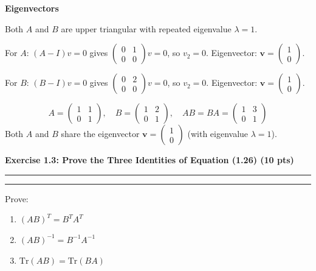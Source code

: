 \documentclass[12pt]{article}
\newcommand{\question}[1]{%
  \clearpage
  \vspace{0.5cm}
  {\noindent\normalsize \textbf{#1}}
  \vspace{0.2cm}
  \hrule
  \vspace{0.1cm}
  \hrule
  \vspace{0.3cm}
}
\begin{document}
\begin{stepbox}
\textbf{Eigenvectors}

Both $A$ and $B$ are upper triangular with repeated eigenvalue $\lambda = 1$.

For $A$: $(A - I)v = 0$ gives $\begin{pmatrix} 0 & 1 \\ 0 & 0 \end{pmatrix}v = 0$, so $v_2 = 0$. Eigenvector: $\mathbf{v} = \begin{pmatrix} 1 \\ 0 \end{pmatrix}$.

For $B$: $(B - I)v = 0$ gives $\begin{pmatrix} 0 & 2 \\ 0 & 0 \end{pmatrix}v = 0$, so $v_2 = 0$. Eigenvector: $\mathbf{v} = \begin{pmatrix} 1 \\ 0 \end{pmatrix}$.
\end{stepbox}

\begin{resultsbox}
\[
A = \begin{pmatrix} 1 & 1 \\ 0 & 1 \end{pmatrix}, \quad
B = \begin{pmatrix} 1 & 2 \\ 0 & 1 \end{pmatrix}, \quad
AB = BA = \begin{pmatrix} 1 & 3 \\ 0 & 1 \end{pmatrix}
\]
Both $A$ and $B$ share the eigenvector $\boxed{\mathbf{v} = \begin{pmatrix} 1 \\ 0 \end{pmatrix}}$ (with eigenvalue $\lambda = 1$).
\end{resultsbox}


\question{Exercise 1.3: Prove the Three Identities of Equation (1.26) (10 pts)}\label{quest:1.3}

Prove:
\begin{enumerate}
    \item $(AB)^T = B^T A^T$
    \item $(AB)^{-1} = B^{-1} A^{-1}$
    \item $\mathrm{Tr}(AB) = \mathrm{Tr}(BA)$
\end{enumerate}
\end{document}
